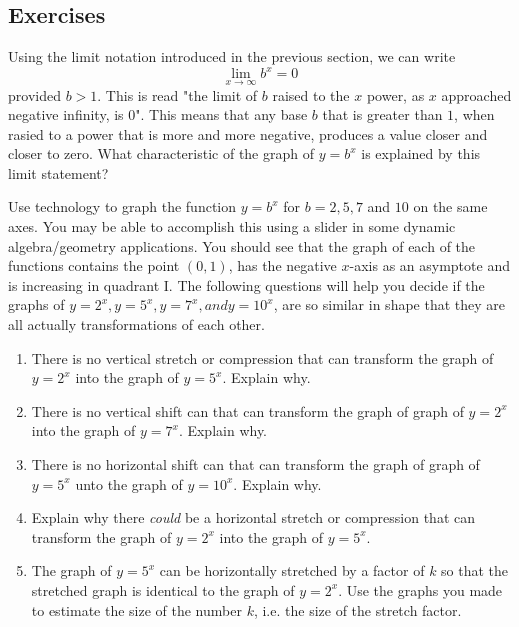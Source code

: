 \documentclass[10pt,]{book}
\theoremstyle{ptxdefinitionnotitle}
\theoremstyle{ptxdefinitiontitle}
\theoremstyle{ptxdefinitionnotitle}
\theoremstyle{ptxdefinitiontitle}
\theoremstyle{ptxdefinitionnotitle}
\theoremstyle{ptxdefinitiontitle}
\numberwithin{equation}{section}
\newcommand{\gt}{>}
\begin{document}
\subsection[{Exercises}]{Exercises}\label{exercises-9}
\begin{divisionexercise}{1}\hypertarget{exercise-60}{}
\hypertarget{p-256}{}%
Using the limit notation introduced in the previous section, we can write%
\begin{equation*}
\lim_{x \to \infty} b^x = 0
\end{equation*}
provided \(b \gt 1\). This is read "the limit of \(b\) raised to the \(x\) power, as \(x\) approached negative infinity, is \(0\)". This means that any base \(b\) that is greater than \(1\), when rasied to a power that is more and more negative, produces a value closer and closer to zero. What characteristic of the graph of \(y=b^x\) is explained by this limit statement?%
\end{divisionexercise}%
\begin{divisionexercise}{2}\hypertarget{exercise-61}{}
\hypertarget{p-257}{}%
Use technology to graph the function  \(y=b^x\) for \(b = 2, 5, 7\) and \(10\) on the same axes. You may be able to accomplish this using a slider in some dynamic algebra/geometry applications. You should see that the graph of each of the functions contains the point \((0,1)\), has the negative \(x\)-axis as an asymptote and is increasing in quadrant I. The following questions will help you decide if the graphs of \(y=2^x, y=5^x, y=7^x,and y=10^x\), are so similar in shape that they are all actually transformations of each other.%
\leavevmode%
\begin{enumerate}[label=(\alph*)]
\item\hypertarget{li-116}{}There is no vertical stretch or compression that can transform the graph of \(y=2^x\) into the graph of \(y=5^x\).  Explain why.%
\item\hypertarget{li-117}{}There is no vertical shift can that can transform the graph of graph of \(y=2^x\) into the graph of \(y=7^x\). Explain why.%
\item\hypertarget{li-118}{}There is no horizontal shift can that can transform the graph of graph of \(y=5^x\) unto the graph of \(y=10^x\). Explain why.%
\item\hypertarget{li-119}{}Explain why there \emph{could} be a horizontal stretch or compression that can transform the graph of \(y=2^x\) into the graph of \(y=5^x\).%
\item\hypertarget{li-120}{}The graph of \(y=5^x\) can be horizontally stretched by a factor of \(k\) so that the stretched graph is identical to the graph of \(y=2^x\). Use the graphs you made to estimate the size of the number \(k\), i.e. the size of the stretch factor.%
\end{enumerate}
\end{divisionexercise}%
\typeout{************************************************}
\typeout{************************************************}
\end{document}
